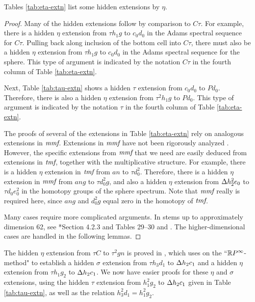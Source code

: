\begin{thm}
\label{thm:eta-extn}
Tables \ref{tab:eta-extn}  list some hidden extensions by $\eta$.
\end{thm}

\begin{proof}
Many of the hidden extensions follow by comparison to 
$C\tau$.  For example, there is a hidden $\eta$ extension
from $\tau h_1 g$ to $c_0 d_0$ in the Adams spectral
sequence for $C\tau$.
Pulling back along inclusion of the bottom cell into $C\tau$,
there must also be a hidden $\eta$ extension from $\tau h_1 g$
to $c_0 d_0$ in the Adams spectral sequence for the sphere.
This type of argument is indicated by the notation
$C\tau$ in the fourth column of Table \ref{tab:eta-extn}.

Next, Table \ref{tab:tau-extn} shows a hidden $\tau$
extension from $c_0 d_0$ to $P d_0$.
Therefore, there is also a hidden $\eta$ extension from
$\tau^2 h_1 g$ to $P d_0$.
This type of argument is indicated by the notation $\tau$
in the fourth column of Table \ref{tab:eta-extn}.

The proofs of several of the extensions in Table \ref{tab:eta-extn}
rely on analogous extensions in $\textit{mmf}$.  
Extensions in $\textit{mmf}$ have not been rigorously analyzed \cite{Isaksen18}.
However, the specific extensions from $\textit{mmf}$ that we need
are easily deduced from extensions in $\textit{tmf}$, together
with the multiplicative structure.
For example, there is a hidden $\eta$ extension in $\textit{tmf}$
from $a n$ to $\tau d_0^2$.
Therefore, there is a hidden $\eta$ extension in $\textit{mmf}$
from $a n g$ to $\tau d_0^2 g$, and also a hidden
$\eta$ extension from $\Delta h_2^2 e_0$ to $\tau d_0 e_0^2$
in the homotopy groups of the sphere spectrum.
Note that $\textit{mmf}$ really is required here, since 
$a n g$ and $d_0^2 g$ equal
zero in the homotopy of $\textit{tmf}$.


Many cases require more complicated arguments.  In stems up to
approximately dimension 62, see 
\cite{Isaksen14c}*{Section 4.2.3 and Tables 29--30} and
\cite{WangXu18}.
The higher-dimensional cases are handled in the following lemmas.
\end{proof}

\begin{remark}
\label{rem:eta-tC}
The hidden $\eta$ extension from $\tau C$ to $\tau^2 g n$
is proved in \cite{WangXu18}, which uses on the
``$\mathbb{R} P^\infty$-method" to establish a hidden
$\sigma$ extension from $\tau h_3 d_1$ to $\Delta h_2 c_1$
and a hidden $\eta$ extension from $\tau h_1 g_2$ to $\Delta h_2 c_1$.
We now have easier proofs for these $\eta$ and $\sigma$ extensions,
using the hidden $\tau$ extension from $h_1^2 g_2$ to $\Delta h_2 c_1$
given in Table \ref{tab:tau-extn}, as well as the relation
$h_3^2 d_1 = h_1^2 g_2$.
\end{remark}



